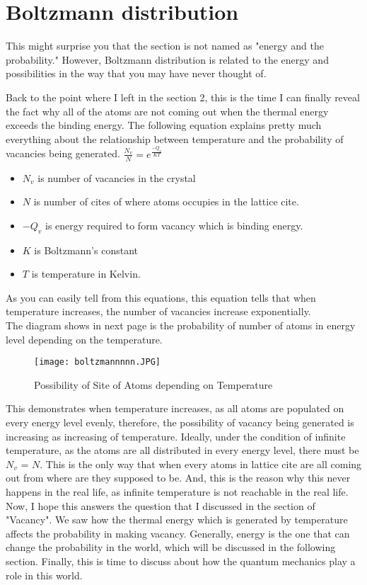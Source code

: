 \documentclass{article}
\begin{document}
\section{Boltzmann distribution}
This might surprise you that the section is not named as "energy and the probability." However, Boltzmann distribution is related to the energy and possibilities in the way that you may have never thought of. 

Back to the point where I left in the section 2, this is the time I can finally reveal the fact why all of the atoms are not coming out when the thermal energy exceeds the binding energy. 
The following equation explains pretty much everything about the relationship between temperature and the probability of vacancies being generated. 
\LARGE
$\frac{N_v}{N} = e^\frac{-Q_v}{KT}\ $     
\\
\normalsize
\begin{itemize}
    \item $ N_v$ is number of vacancies in the crystal 
    \item $ N$ is number of cites of where atoms occupies in the lattice cite. 
    \item $-Q_v$ is energy required to form vacancy which is binding energy.
    \item $K$ is Boltzmann's constant 
    \item $T$ is temperature in Kelvin. 
\end{itemize}

As you can easily tell from this equations, this equation tells that when temperature increases, the number of vacancies increase exponentially. \\ The diagram shows in next page is the probability of number of atoms in energy level depending on the temperature.
\\

\begin{figure}
    \centering
    \texttt{[image: boltzmannnnn.JPG]}
    \caption{Possibility of Site of Atoms depending on Temperature}
    \label{fig:l}
\end{figure}
This demonstrates when temperature increases, as all atoms are populated on every energy level evenly, therefore, the possibility of vacancy being generated is increasing as increasing of temperature. Ideally, under the condition of infinite temperature, as the atoms are all distributed in every energy level, there must be $N_v$ = $N$. This is the only way that when every atoms in lattice cite are all coming out from where are they supposed to be. And, this is the reason why this never happens in the real life, as infinite temperature is not reachable in the real life. Now, I hope this answers the question that I discussed in the section of "Vacancy". We saw how the thermal energy which is generated by temperature affects the probability in making vacancy. 
Generally, energy is the one that can change the probability in the world, which will be discussed in the following section.
Finally, this is time to discuss about how the quantum mechanics play a role in this world. 
\end{document}
